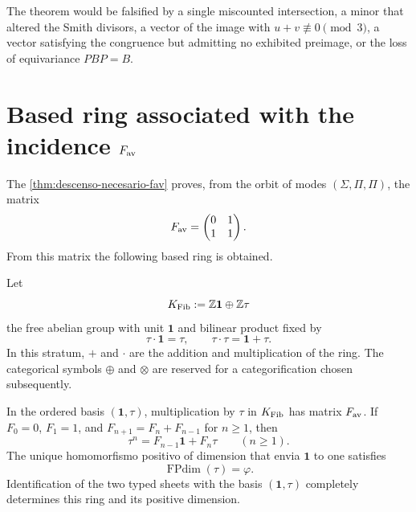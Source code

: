 \begin{criterion}
\label{crit:incidencia-residuo-soporte}
The theorem would be falsified by a single miscounted intersection, a minor that altered
the Smith divisors, a vector of the image with \(u+v\not\equiv0\pmod3\),
a vector satisfying the congruence but admitting no exhibited preimage,
or the loss of equivariance \(PBP=B\).
\end{criterion}

\section[Fibonacci-based Ring]{Based ring associated with the incidence
  \texorpdfstring{\(F_{\rm av}\)}{F\_av}}
\label{sec:anillo-basado-fibonacci}

The \cref{thm:descenso-necesario-fav} proves, from the orbit of
modes \((\Sigma,\Pi,\Pi)\), the matrix
\[
 F_{\rm av}=
 \begin{pmatrix}0&1\\1&1\end{pmatrix}.
\]
From this matrix the following based ring is obtained.

\begin{definition}
\label{def:anillo-basado-fibonacci}
Let
\[
 K_{\rm Fib}:=\mathbb Z\mathbf 1\oplus\mathbb Z\tau
\]
the free abelian group with unit \(\mathbf 1\) and bilinear product fixed by
\[
 \tau\cdot\mathbf 1=\tau,\qquad
 \tau\cdot\tau=\mathbf 1+\tau.
\]
In this stratum, \(+\) and \(\cdot\) are the addition and multiplication of the
ring. The categorical symbols \(\oplus\) and \(\otimes\) are reserved for
a categorification chosen subsequently.
\end{definition}

\begin{theorem}
\label{thm:anillo-fibonacci-fav}
In the ordered basis \((\mathbf 1,\tau)\), multiplication by \(\tau\) in
\(K_{\rm Fib}\) has matrix \(F_{\rm av}\). If
\(F_0=0\), \(F_1=1\), and
\(F_{n+1}=F_n+F_{n-1}\) for \(n\geq1\), then
\[
 \tau^n=F_{n-1}\mathbf 1+F_n\tau
 \qquad(n\geq1).
\]
The unique homomorfismo positivo of dimension that envia
\(\mathbf 1\) to one satisfies
\[
 \operatorname{FPdim}(\tau)=\varphi.
\]
Identification of the two typed sheets with the basis
\((\mathbf 1,\tau)\) completely determines this ring and its positive
dimension.
\end{theorem}

